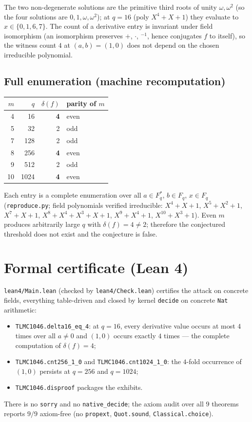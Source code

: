 \documentclass[11pt]{article}
\begin{document}
The two non-degenerate solutions are the primitive third roots of unity
$\omega, \omega^2$ (so the four solutions are $0, 1, \omega, \omega^2$); at
$q = 16$ (poly $X^4+X+1$) they evaluate to $x \in \{0, 1, 6, 7\}$.
The count of a derivative entry is invariant under field isomorphism (an
isomorphism preserves $+$, $\cdot$, $^{-1}$, hence conjugates $f$ to itself),
so the witness count $4$ at $(a,b) = (1,0)$ does not depend on the chosen
irreducible polynomial.

\subsection{Full enumeration (machine recomputation)}

\begin{center}
\begin{tabular}{rrrl}
\toprule
$m$ & $q$ & $\delta(f)$ & parity of $m$ \\
\midrule
4  & 16   & \textbf{4} & even \\
5  & 32   & 2 & odd \\
7  & 128  & 2 & odd \\
8  & 256  & \textbf{4} & even \\
9  & 512  & 2 & odd \\
10 & 1024 & \textbf{4} & even \\
\bottomrule
\end{tabular}
\end{center}

Each entry is a complete enumeration over all $a \in F_q^{*}$, $b \in F_q$,
$x \in F_q$ (\texttt{reproduce.py}; field polynomials verified irreducible:
$X^4{+}X{+}1$, $X^5{+}X^2{+}1$, $X^7{+}X{+}1$, $X^8{+}X^4{+}X^3{+}X{+}1$,
$X^9{+}X^4{+}1$, $X^{10}{+}X^3{+}1$). Even $m$ produces arbitrarily large $q$
with $\delta(f) = 4 \neq 2$; therefore the conjectured threshold does not exist
and the conjecture is false.

\section{Formal certificate (Lean 4)}

\texttt{lean4/Main.lean} (checked by \texttt{lean4/Check.lean}) certifies the
attack on concrete fields, everything table-driven and closed by kernel
\texttt{decide} on concrete \texttt{Nat} arithmetic:
\begin{itemize}
\item \texttt{TLMC1046.delta16\_eq\_4}: at $q = 16$, every derivative value
occurs at most $4$ times over all $a \neq 0$ and $(1,0)$ occurs exactly $4$
times --- the complete computation of $\delta(f) = 4$;
\item \texttt{TLMC1046.cnt256\_1\_0} and \texttt{TLMC1046.cnt1024\_1\_0}: the
$4$-fold occurrence of $(1,0)$ persists at $q = 256$ and $q = 1024$;
\item \texttt{TLMC1046.disproof} packages the exhibits.
\end{itemize}
There is no \texttt{sorry} and no \texttt{native\_decide}; the axiom audit over
all $9$ theorems reports $9/9$ axiom-free (no \texttt{propext},
\texttt{Quot.sound}, \texttt{Classical.choice}).
\end{document}
